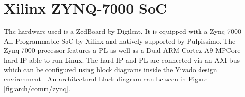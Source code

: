 \documentclass[../bachelor_paper.tex]{subfiles}
\begin{document}
\section{Xilinx ZYNQ-7000 SoC}
The hardware used is a ZedBoard by Digilent. It is equipped with a Zynq-7000 All Programmable \ac{SoC} by Xilinx and natively supported by Pulpissimo. The Zynq-7000 processor features a \ac{PL} as well as a Dual ARM Cortex-A9 MPCore hard IP able to run Linux. The hard IP and \ac{PL} are connected via an AXI bus which can be configured using block diagrams inside the Vivado design environment \cite{Zynq7000SoC}. An architectural block diagram can be seen in Figure \ref{fig:arch/comm/zynq}.


\isstandalone



\fi
\end{document}
